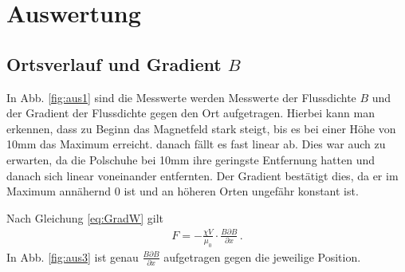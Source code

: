 \documentclass[12pt,a4paper,titlepage,headinclude,bibtotoc]{scrartcl}
\begin{document}
\section{Auswertung}
\label{sec:auswertung}
\subsection{Ortsverlauf und Gradient $B$}
In Abb. \ref{fig:aus1} sind die Messwerte werden Messwerte der Flussdichte $B$ und der Gradient der Flussdichte gegen den Ort aufgetragen.
Hierbei kann man erkennen, dass zu Beginn das Magnetfeld stark steigt, bis es bei einer Höhe von 10mm das Maximum erreicht. danach fällt es fast linear ab.
Dies war auch zu erwarten, da die Polschuhe bei 10mm ihre geringste Entfernung hatten und danach sich linear voneinander entfernten.
Der Gradient bestätigt dies, da er im Maximum annähernd 0 ist und an höheren Orten ungefähr konstant ist.

Nach Gleichung \eqref{eq:GradW} gilt
\begin{align}
	F=-\frac{\chi V}{\mu_0}\cdot\frac{B\partial B}{\partial x}\, .\label{eq:FB}
\end{align}
In Abb. \ref{fig:aus3} ist genau $\frac{B\partial B}{\partial x}$ aufgetragen gegen die jeweilige Position.
\end{document}
